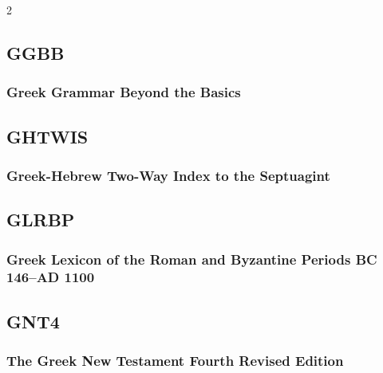 \begin{multicols}{2}
	\subsection*{GGBB}
	
		\subsubsection*{Greek Grammar Beyond the Basics}
		
			\phantom{.}
			
	\subsection*{GHTWIS}
	
		\subsubsection*{Greek-Hebrew Two-Way Index to the Septuagint}
		
			\phantom{.}
			
	\subsection*{GLRBP}
	
		\subsubsection*{Greek Lexicon of the Roman and Byzantine Periods BC 146--AD 1100}
		
			\phantom{.}
			
	\subsection*{GNT4}
	
		\subsubsection*{The Greek New Testament Fourth Revised Edition}
		

\end{multicols}

